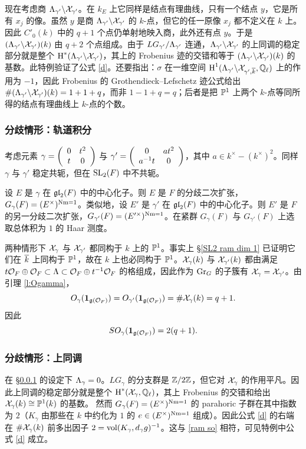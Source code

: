 现在考虑商 $\Lambda_{\gamma'}\backslash\mathcal{X}_{\gamma'}$。在 $k_{E}$ 上它同样是结点有理曲线，只有一个结点 $y$，它是所有 $x_{j}$ 的像。虽然 $y$ 是商 $\Lambda_{\gamma'}\backslash\mathcal{X}_{\gamma'}$ 的 $k$-点，但它的任一原像 $x_{j}$ 都不定义在 $k$ 上。因此 $C'_{0}(k)$ 中的 $q+1$ 个点仍单射地映入商，此外还有点 $y$。于是 $(\Lambda_{\gamma'}\backslash\mathcal{X}_{\gamma'})(k)$ 由 $q+2$ 个点组成。由于 $LG_{\gamma'}/\Lambda_{\gamma'}$ 连通，$\Lambda_{\gamma'}\backslash\mathcal{X}_{\gamma'}$ 的上同调的稳定部分就是整个 $\textup{H}^{*}({\Lambda_{\gamma'}\backslash\mathcal{X}_{\gamma'}})$，其上的 Frobenius 迹的交错和等于 $(\Lambda_{\gamma'}\backslash\mathcal{X}_{\gamma'})(k)$ 的基数。此特例验证了公式 \eqref{d}。还要指出：$\sigma$ 在一维空间 $\textup{H}^{1}({\Lambda_{\gamma'}\backslash\mathcal{X}_{\gamma',\overline{k}},\mathbb{Q}_{\ell}})$ 上的作用为 $-1$，因此 Frobenius 的 Grothendieck--Lefschetz 迹公式给出 $\#(\Lambda_{\gamma'}\backslash\mathcal{X}_{\gamma'})(k)= 1+1+q$，而非 $1-1+q=q$；后者是把 $\mathbb{P}^{1}$ 上两个 $k$-点等同所得的结点有理曲线上 $k$-点的个数。

\subsubsection{分歧情形：轨道积分}\label{sss:ram orb SL2} 考虑元素 $\gamma=\left(\begin{array}{cc} 0 & t^{2} \\ t & 0 \end{array}\right)$ 与 $\gamma'=\left(\begin{array}{cc} 0 & at^{2} \\ a^{-1}t & 0 \end{array}\right)$，其中 $a\in k^{\times}-(k^{\times})^{2}$。同样 $\gamma$ 与 $\gamma'$ 稳定共轭，但在 $\textup{SL}_{2}(F)$ 中不共轭。

设 $E$ 是 $\gamma$ 在 $\mathfrak{gl}_{2}(F)$ 中的中心化子。则 $E$ 是 $F$ 的分歧二次扩张，$G_{\gamma}(F)=(E^{\times})^{\textup{Nm}=1}$。类似地，设 $E'$ 是 $\gamma'$ 在 $\mathfrak{gl}_{2}(F)$ 中的中心化子。则 $E'$ 是 $F$ 的另一分歧二次扩张，$G_{\gamma'}(F)=(E'^{\times})^{\textup{Nm}=1}$。在紧群 $G_{\gamma}(F)$ 与 $G_{\gamma'}(F)$ 上选取总体积为 $1$ 的 Haar 测度。

两种情形下 $\mathcal{X}_{\gamma}$ 与 $\mathcal{X}_{\gamma'}$ 都同构于 $k$ 上的 $\mathbb{P}^{1}$。事实上 \S\ref{SL2 ram dim 1} 已证明它们在 $\overline{k}$ 上同构于 $\mathbb{P}^{1}$，故在 $k$ 上也必同构于 $\mathbb{P}^{1}$。$\mathcal{X}_{\gamma}(k)$ 与 $\mathcal{X}_{\gamma'}(k)$ 都由满足 $t\mathcal{O}_{F}\oplus\mathcal{O}_{F}\subset \Lambda\subset \mathcal{O}_{F}\oplus t^{-1}\mathcal{O}_{F}$ 的格组成，因此作为 $\textup{Gr}_{G}$ 的子簇有 $\mathcal{X}_{\gamma}=\mathcal{X}_{\gamma'}$。由引理 \ref{l:Ogamma}，
\begin{equation*}
O_{\gamma}(\mathbf{1}_{\mathfrak{g}(\mathcal{O}_{F})})=O_{\gamma'}(\mathbf{1}_{\mathfrak{g}(\mathcal{O}_{F})})=\#\mathcal{X}_{\gamma}(k)=q+1.
\end{equation*}
因此
\begin{equation}\label{ram so}
SO_{\gamma}(\mathbf{1}_{\mathfrak{g}(\mathcal{O}_{F})})=2(q+1).
\end{equation}

\subsubsection{分歧情形：上同调} 在 \S\ref{sss:ram orb SL2} 的设定下 $\Lambda_{\gamma}=0$。$LG_{\gamma}$ 的分支群是 $\mathbb{Z}/2\mathbb{Z}$，但它对 $\mathcal{X}_{\gamma}$ 的作用平凡。因此上同调的稳定部分就是整个 $\textup{H}^{*}({\mathcal{X}_{\gamma},\mathbb{Q}_{\ell}})$，其上 Frobenius 的交错和给出 $\mathcal{X}_{\gamma}(k)\cong\mathbb{P}^{1}(k)$ 的基数。
然而 $G_{\gamma}(F)=(E^{\times})^{\textup{Nm}=1}$ 的 parahoric 子群在其中指数为 $2$（$K_{\gamma}$ 由那些在 $k$ 中约化为 $1$ 的 $e\in (E^{\times})^{\textup{Nm}=1}$ 组成）。因此公式 \eqref{d} 的右端在 $\#\mathcal{X}_{\gamma}(k)$ 前多出因子 $2=\textup{vol}(K_{\gamma},d_{\gamma}g)^{-1}$。这与 \eqref{ram so} 相符，可见特例中公式 \eqref{d} 成立。

